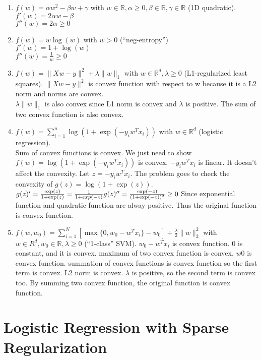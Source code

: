 \documentclass{article}
\def\blu#1{{\color{blu}#1}}
\def\norm#1{\|#1\|}
\def\R{\mathbb{R}}
\def\enum#1{\begin{enumerate}#1\end{enumerate}}
\begin{document}
\enum{
\item $f(w) = \alpha w^2 - \beta w + \gamma$ with $w \in \R, \alpha \geq 0, \beta \in \R, \gamma \in \R$ (1D quadratic).\\
\blu{$f'(w)=2\alpha w - \beta$\\
$f''(w)=2\alpha \geq 0$}
\item $f(w) = w\log(w) $ with $w > 0$ (``neg-entropy'')\\
\blu{$f'(w)=1 + \log(w)$\\
	$f''(w)=\frac{1}{w} \geq 0$}
\item $f(w) = \norm{Xw-y}^2 + \lambda\norm{w}_1$ with $w \in \R^d, \lambda \geq 0$ (L1-regularized least squares).
\blu{$\norm{Xw-y}^2$ is convex function with respect to w because it is a L2 norm and norms are convex.}\\
 $\lambda\norm{w}_1$ is also convex since L1 norm is convex and $\lambda$ is positive. The sum of two convex function is also convex.\\
\item $f(w) = \sum_{i=1}^n \log(1+\exp(-y_iw^Tx_i)) $ with $w \in \R^d$ (logistic regression).\\
 \blu{Sum of convex functions is convex. We just need to show $f(w) = \log(1+\exp(-y_iw^Tx_i)) $ is convex.
$ -y_iw^Tx_i $ is linear. It doesn't affect the convexity. Let $z= -y_iw^Tx_i $. The problem goes to check the convexity of $ g(z)=\log(1+\exp(z)) $.\\
 $g(z)'= \frac{\exp(z)}{1+\exp(z)}=\frac{1}{1+exp(-z)}\\
 g(z)''=\frac{\exp(-z)}{(1+\exp(-z))^2}\geq0$ Since exponential function and quadratic function are alway positive.
Thus the original function is convex function. }
\item $f(w,w_0) = \sum_{i=1}^N[\max\{0,w_0 - w^Tx_i\} - w_0] + \frac{\lambda}{2}\norm{w}_2^2$  with $w \in R^d, w_0 \in \R, \lambda \geq 0$ (``1-class'' SVM).
\blu{ $w_0 - w^Tx_i$ is convex function. 0 is constant, and it is convex. maximum of two convex function is convex. $w0$ is convex function. summation of convex functions is convex function so the first term is convex. L2 norm is convex. $\lambda$ is positive, so the second term is convex too. By summing two convex function, the original function is convex function.}
}


\section{Logistic Regression with Sparse Regularization}
\end{document}
